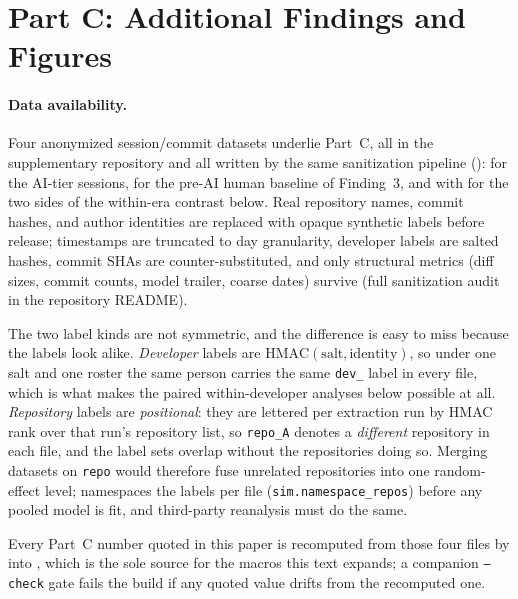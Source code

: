 \section{Part C: Additional Findings and Figures}
\label{app:partc}

\paragraph{Data availability.} Four anonymized session/commit datasets underlie Part~C, all in the supplementary repository and all written by the same sanitization pipeline ():  for the AI-tier sessions,  for the pre-AI human baseline of Finding~3, and  with  for the two sides of the within-era contrast below. Real repository names, commit hashes, and author identities are replaced with opaque synthetic labels before release; timestamps are truncated to day granularity, developer labels are salted hashes, commit SHAs are counter-substituted, and only structural metrics (diff sizes, commit counts, model trailer, coarse dates) survive (full sanitization audit in the repository README).

The two label kinds are not symmetric, and the difference is easy to miss because the labels look alike. \emph{Developer} labels are $\mathrm{HMAC}(\text{salt}, \text{identity})$, so under one salt and one roster the same person carries the same \texttt{dev\_} label in every file, which is what makes the paired within-developer analyses below possible at all. \emph{Repository} labels are \emph{positional}: they are lettered per extraction run by HMAC rank over that run's repository list, so \texttt{repo\_A} denotes a \emph{different} repository in each file, and the label sets overlap without the repositories doing so. Merging datasets on \texttt{repo} would therefore fuse unrelated repositories into one random-effect level;  namespaces the labels per file (\texttt{sim.namespace\_repos}) before any pooled model is fit, and third-party reanalysis must do the same.

Every Part~C number quoted in this paper is recomputed from those four files by  into , which is the sole source for the macros this text expands; a companion \texttt{--check} gate fails the build if any quoted value drifts from the recomputed one.

